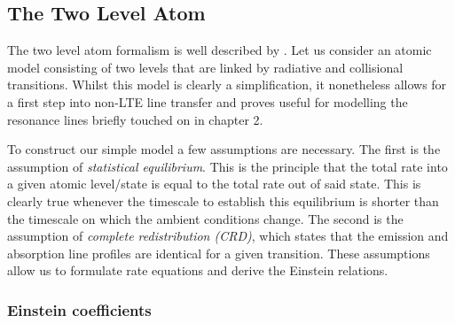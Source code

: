 \subsection{The Two Level Atom}

The two level atom formalism is well described by \cite{mihalas}.
Let us consider an atomic model consisting of two levels that are linked 
by radiative and collisional transitions. 
Whilst this model is clearly a simplification, it nonetheless allows
for a first step into non-LTE line transfer and proves useful for modelling
the resonance lines briefly touched on in chapter 2.

To construct our simple model a few assumptions are necessary. The first
is the assumption of {\em statistical equilibrium}. This is the principle 
that the total rate into a given atomic level/state is equal to the 
total rate out of said state. This is clearly true whenever the timescale
to establish this equilibrium is shorter than the timescale on which
the ambient conditions change. The second is the assumption of
{\em complete redistribution (CRD)}, which states that the emission
and absorption line profiles are identical for a given transition. 
These assumptions allow us to formulate rate equations and derive the 
Einstein relations.

\subsubsection{Einstein coefficients}

